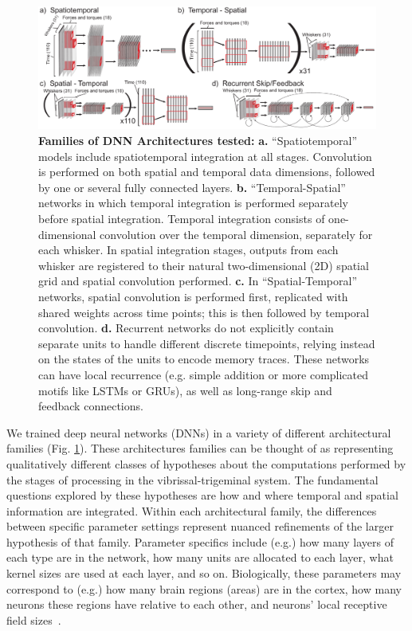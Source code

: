\begin{figure}
\centering
\includegraphics [width=1\linewidth]{figures/architectures.pdf}
\vspace{-4mm}
\caption{\footnotesize{\textbf{Families of DNN Architectures tested:} \textbf{a.} ``Spatiotemporal'' models include spatiotemporal integration at all stages. Convolution is performed on both spatial and temporal data dimensions, followed by one or several fully connected layers. \textbf{b.} ``Temporal-Spatial'' networks in which temporal integration is performed separately before spatial integration.  Temporal integration consists of one-dimensional convolution over the temporal dimension, separately for each whisker. In spatial integration stages, outputs from each whisker are registered to their natural two-dimensional (2D) spatial grid and spatial convolution performed.  \textbf{c.} In ``Spatial-Temporal'' networks, spatial convolution is performed first, replicated with shared weights across time points; this is then followed by temporal convolution. \textbf{d.} Recurrent networks do not explicitly contain separate units to handle different discrete timepoints, relying instead on the states of the units to encode memory traces.  These networks can have local recurrence (e.g. simple addition or more complicated motifs like LSTMs or GRUs), as well as long-range skip and feedback connections.}~\label{fig_archi}}
\vspace{-5mm}
\end{figure}

We trained deep neural networks (DNNs) in a variety of different architectural families (Fig. \ref{fig_archi}).  
These architectures families can be thought of as representing qualitatively different classes of hypotheses about the computations performed by the stages of processing in the vibrissal-trigeminal system. 
The fundamental questions explored by these hypotheses are how and where temporal and spatial information are integrated.
Within each architectural family, the differences between specific parameter settings represent nuanced refinements of the larger hypothesis of that family.   
Parameter specifics include (e.g.) how many layers of each type are in the network, how many units are allocated to each layer, what kernel sizes are used at each layer, and so on.  
Biologically, these parameters may correspond to (e.g.) how many brain regions (areas) are in the cortex, how many neurons these regions have relative to each other, and neurons' local receptive field sizes~\cite{yamins2016using}.
 
